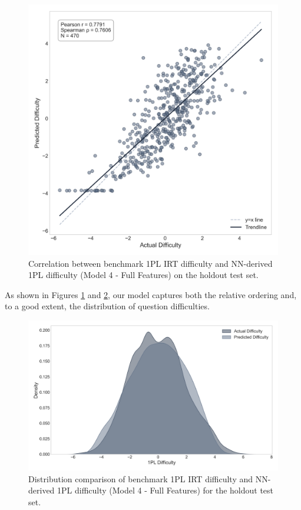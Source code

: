 \documentclass[
    a4paper, %
    10pt, %
    twoside, %
]{LTJournalArticle}
\begin{document}
\begin{figure}[H]
    \centering
    \includegraphics[width=0.8\columnwidth]{figures/difficulty_scatter_Model_4_Full.png} 
    \caption{Correlation between benchmark 1PL IRT difficulty and NN-derived 1PL difficulty (Model 4 - Full Features) on the holdout test set.}
    \label{fig:difficulty-correlation-1pl}
\end{figure}

As shown in Figures \ref{fig:difficulty-correlation-1pl} and \ref{fig:difficulty-distribution-1pl}, our model captures both the relative ordering and, to a good extent, the distribution of question difficulties.

\begin{figure}[H]
    \centering
    \includegraphics[width=1\columnwidth]{figures/difficulty_density_Model_4_Full.png} 
    \caption{Distribution comparison of benchmark 1PL IRT difficulty and NN-derived 1PL difficulty (Model 4 - Full Features) for the holdout test set.}
    \label{fig:difficulty-distribution-1pl}
\end{figure}
\end{document}
